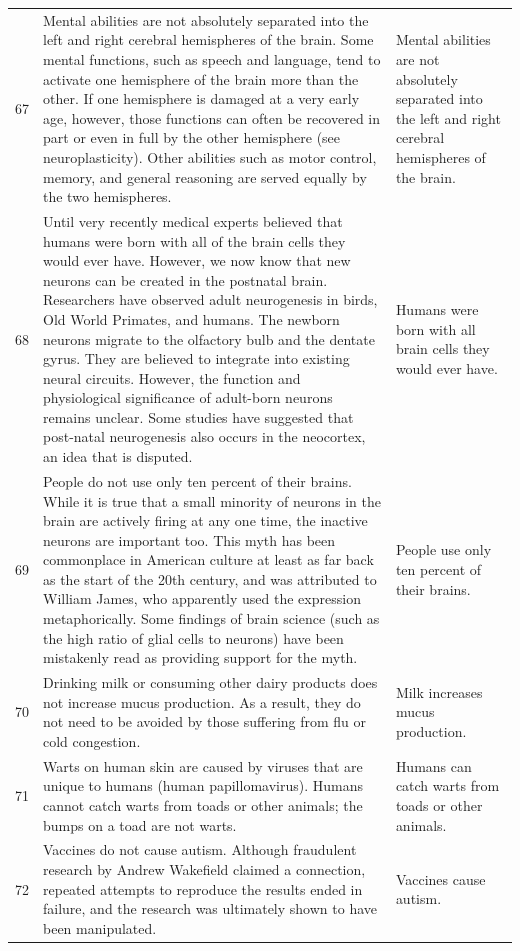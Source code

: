 \begin{tabular}{c|p{}|p{}}
67 & Mental abilities are not absolutely separated into the left and right cerebral hemispheres of the brain. Some mental functions, such as speech and language, tend to activate one hemisphere of the brain more than the other. If one hemisphere is damaged at a very early age, however, those functions can often be recovered in part or even in full by the other hemisphere (see neuroplasticity). Other abilities such as motor control, memory, and general reasoning are served equally by the two hemispheres. & Mental abilities are not absolutely separated into the left and right cerebral hemispheres of the brain. \\
68 & Until very recently medical experts believed that humans were born with all of the brain cells they would ever have. However, we now know that new neurons can be created in the postnatal brain. Researchers have observed adult neurogenesis in birds, Old World Primates, and humans. The newborn neurons migrate to the olfactory bulb and the dentate gyrus. They are believed to integrate into existing neural circuits. However, the function and physiological significance of adult-born neurons remains unclear. Some studies have suggested that post-natal neurogenesis also occurs in the neocortex, an idea that is disputed. & Humans were born with all brain cells they would ever have. \\
69 & People do not use only ten percent of their brains. While it is true that a small minority of neurons in the brain are actively firing at any one time, the inactive neurons are important too. This myth has been commonplace in American culture at least as far back as the start of the 20th century, and was attributed to William James, who apparently used the expression metaphorically. Some findings of brain science (such as the high ratio of glial cells to neurons) have been mistakenly read as providing support for the myth. & People use only ten percent of their brains. \\
70 & Drinking milk or consuming other dairy products does not increase mucus production. As a result, they do not need to be avoided by those suffering from flu or cold congestion. & Milk increases mucus production. \\
71 & Warts on human skin are caused by viruses that are unique to humans (human papillomavirus). Humans cannot catch warts from toads or other animals; the bumps on a toad are not warts. & Humans can catch warts from toads or other animals. \\
72 & Vaccines do not cause autism. Although fraudulent research by Andrew Wakefield claimed a connection, repeated attempts to reproduce the results ended in failure, and the research was ultimately shown to have been manipulated. & Vaccines cause autism. \\

\end{tabular}
